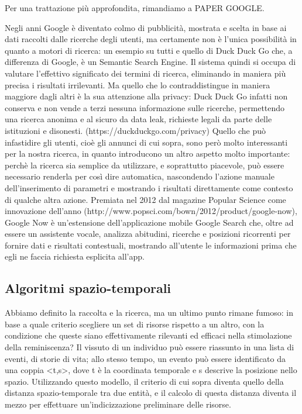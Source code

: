 \documentclass[sigproc-sp.tex]{subfiles}
\begin{document}
Per una trattazione più approfondita, rimandiamo a PAPER GOOGLE.

Negli anni Google è diventato colmo di pubblicità, mostrata e scelta in base ai dati raccolti dalle ricerche degli utenti, ma certamente non è l’unica possibilità in quanto a motori di ricerca: un esempio su tutti e quello di Duck Duck Go che, a differenza di Google, è un Semantic Search Engine. Il sistema quindi si occupa di valutare l’effettivo significato dei termini di ricerca, eliminando in maniera più precisa i risultati irrilevanti. Ma quello che lo contraddistingue in maniera maggiore dagli altri è la sua attenzione alla privacy: Duck Duck Go infatti non conserva e non vende a terzi nessuna informazione sulle ricerche, permettendo una ricerca anonima e al sicuro da data leak, richieste legali da parte delle istituzioni e disonesti. (https://duckduckgo.com/privacy)
Quello che può infastidire gli utenti, cioè gli annunci di cui sopra, sono però molto interessanti per la nostra ricerca, in quanto introducono un altro aspetto molto importante: perchè la ricerca sia semplice da utilizzare, e soprattutto piacevole, può essere necessario renderla per così dire automatica, nascondendo l’azione manuale dell’inserimento di parametri e mostrando i risultati direttamente come contesto di qualche altra azione. Premiata nel 2012 dal magazine Popular Science come innovazione dell’anno (http://www.popsci.com/bown/2012/product/google-now), Google Now è un’estensione dell’applicazione mobile Google Search che, oltre ad essere un assistente vocale, analizza abitudini, ricerche e posizioni ricorrenti per fornire dati e risultati contestuali, mostrando all’utente le informazioni prima che egli ne faccia richiesta esplicita all’app.

\subsection{Algoritmi spazio-temporali}
Abbiamo definito la raccolta e la ricerca, ma un ultimo punto rimane fumoso: in base a quale criterio scegliere un set di risorse rispetto a un altro, con la condizione che queste siano effettivamente rilevanti ed efficaci nella stimolazione della reminiscenza? Il vissuto di un individuo può essere riassunto in una lista di eventi, di storie di vita; allo stesso tempo, un evento può essere identificato da una coppia <t,s>, dove t è la coordinata temporale e s descrive la posizione nello spazio. Utilizzando questo modello, il criterio di cui sopra diventa quello della distanza spazio-temporale tra due entità, e il calcolo di questa distanza diventa il mezzo per effettuare un’indicizzazione preliminare delle risorse.
\end{document}
